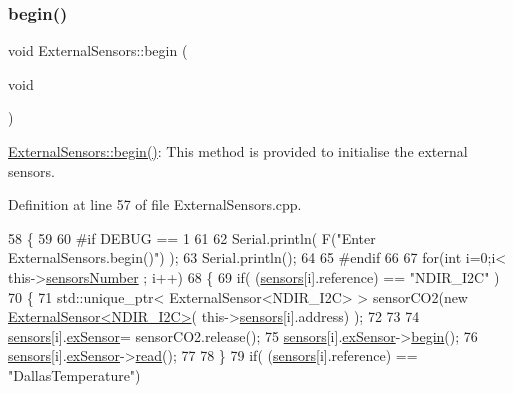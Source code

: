 \subsubsection{\texorpdfstring{begin()}{begin()}}
{\footnotesize\ttfamily void External\+Sensors\+::begin (\begin{DoxyParamCaption}\item[{void}]{ }\end{DoxyParamCaption})}

\hyperlink{class_external_sensors_a58ede0d786a86417254708870f04a21e}{External\+Sensors\+::begin()}\+: This method is provided to initialise the external sensors. 

Definition at line 57 of file External\+Sensors.\+cpp.


\begin{DoxyCode}
58 \{
59 
60 \textcolor{preprocessor}{#if DEBUG == 1}
61 
62     Serial.println( F(\textcolor{stringliteral}{"Enter ExternalSensors.begin()"}) );
63     Serial.println();
64 
65 \textcolor{preprocessor}{#endif }
66 
67     \textcolor{keywordflow}{for}(\textcolor{keywordtype}{int} i=0;i< this->\hyperlink{class_external_sensors_a58e4fbf9adeae787d92be5fa33043b5d}{sensorsNumber} ; i++)
68     \{
69         \textcolor{keywordflow}{if}( (\hyperlink{class_external_sensors_a284233f884fcf00154a44740cf1d9e1e}{sensors}[i].reference) == \textcolor{stringliteral}{"NDIR\_I2C"} )
70         \{   
71             std::unique\_ptr< ExternalSensor<NDIR\_I2C> > sensorCO2(\textcolor{keyword}{new} 
      \hyperlink{class_external_sensor_3_01_n_d_i_r___i2_c_01_4}{ExternalSensor<NDIR\_I2C>}( this->\hyperlink{class_external_sensors_a284233f884fcf00154a44740cf1d9e1e}{sensors}[i].address) );
72 
73 
74             \hyperlink{class_external_sensors_a284233f884fcf00154a44740cf1d9e1e}{sensors}[i].\hyperlink{struct_external_sensors_1_1sensor_a9bca150fd468b8d0e090e6d72c5c2b48}{exSensor}= sensorCO2.release();
75             \hyperlink{class_external_sensors_a284233f884fcf00154a44740cf1d9e1e}{sensors}[i].\hyperlink{struct_external_sensors_1_1sensor_a9bca150fd468b8d0e090e6d72c5c2b48}{exSensor}->\hyperlink{class_base_external_sensor_a87d132803d4f4fdd4e66332809f0c9a0}{begin}();
76             \hyperlink{class_external_sensors_a284233f884fcf00154a44740cf1d9e1e}{sensors}[i].\hyperlink{struct_external_sensors_1_1sensor_a9bca150fd468b8d0e090e6d72c5c2b48}{exSensor}->\hyperlink{class_base_external_sensor_a1564f16deacf57b51b9948ac29db4291}{read}();
77 
78         \}
79         \textcolor{keywordflow}{if}( (\hyperlink{class_external_sensors_a284233f884fcf00154a44740cf1d9e1e}{sensors}[i].reference) == \textcolor{stringliteral}{"DallasTemperature"})

\end{DoxyCode}
